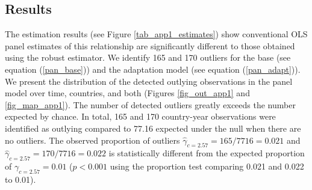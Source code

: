 \documentclass[11pt, letterpaper]{article}
\numberwithin{algorithm}{section}
\numberwithin{assumption}{section}
\numberwithin{lemma}{section}
\numberwithin{theorem}{section}
\numberwithin{corollary}{section}
\numberwithin{remark}{section}
\numberwithin{equation}{section}
\numberwithin{figure}{section}
\numberwithin{table}{section}
\begin{document}
\subsection{Results}

The estimation results (see Figure \ref{tab_app1_estimates}) show conventional OLS panel estimates of this relationship are significantly different to those obtained using the robust estimator. We identify 165 and 170 outliers for the base (see equation (\ref{pan_base})) and the adaptation model (see equation (\ref{pan_adapt})). We present the distribution of the detected outlying observations in the panel model over time, countries, and both (Figures \ref{fig_out_app1} and \ref{fig_map_app1}). The number of detected outliers greatly exceeds the number expected by chance. In total, 165 and 170 country-year observations were identified as outlying compared to 77.16 expected under the null when there are no outliers. The observed proportion of outliers $\hat{\gamma}_{c=2.57}= 165/7716=0.021$ and $\hat{\gamma}_{c=2.57}= 170/7716=0.022$ is statistically different from the expected proportion of $\gamma_{c=2.57}=0.01$ ($p<0.001$ using the \citet{jiao2018testing} proportion test comparing 0.021 and 0.022 to 0.01).
\end{document}
